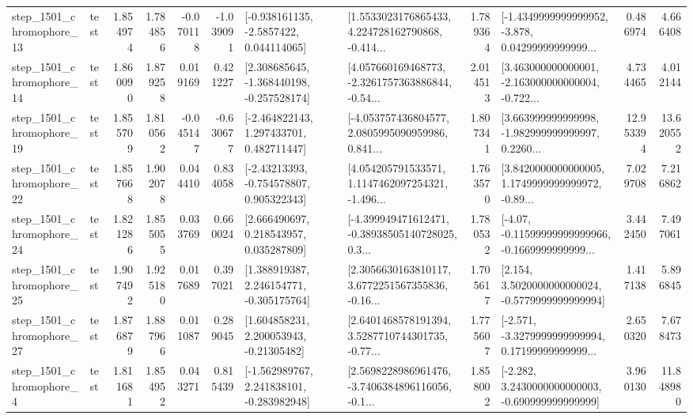 \begin{tabular}{llrrrrllrlrr}
 step\_1501\_chromophore\_13 &      test &      1.854974 &    1.784856 &     -0.070118 & -1.039091 &     [-0.938161135, -2.5857422, 0.044114065] &  [1.5533023176865433, 4.224728162790868, -0.414... &       1.789364 &  [-1.4349999999999952, -3.878, 0.04299999999999... &            0.486974 &          4.666408 \\
 step\_1501\_chromophore\_14 &      test &      1.860090 &    1.879258 &      0.019169 &  0.421227 &   [2.308685645, -1.368440198, -0.257528174] &  [4.057660169468773, -2.3261757363886844, -0.54... &       2.014513 &  [3.463000000000001, -2.163000000000004, -0.722... &            4.734465 &          4.012144 \\
 step\_1501\_chromophore\_19 &      test &      1.855709 &    1.810562 &     -0.045147 & -0.630677 &    [-2.464822143, 1.297433701, 0.482711447] &  [-4.053757436804577, 2.0805995090959986, 0.841... &       1.807341 &  [3.663999999999998, -1.982999999999997, 0.2260... &           12.953394 &         13.620552 \\
 step\_1501\_chromophore\_22 &      test &      1.857668 &    1.902078 &      0.044410 &  0.834058 &    [-2.43213393, -0.754578807, 0.905322343] &  [4.054205791533571, 1.1147462097254321, -1.496... &       1.763570 &  [3.8420000000000005, 1.1749999999999972, -0.89... &            7.029708 &          7.216862 \\
 step\_1501\_chromophore\_24 &      test &      1.821286 &    1.855055 &      0.033769 &  0.660024 &     [2.666490697, 0.218543957, 0.035287809] &  [-4.399949471612471, -0.38938505140728025, 0.3... &       1.780532 &  [-4.07, -0.11599999999999966, -0.1669999999999... &            3.442450 &          7.497061 \\
 step\_1501\_chromophore\_25 &      test &      1.907492 &    1.925180 &      0.017689 &  0.397021 &    [1.388919387, 2.246154771, -0.305175764] &  [2.3056630163810117, 3.6772251567355836, -0.16... &       1.705617 &   [2.154, 3.5020000000000024, -0.5779999999999994] &            1.417138 &          5.896845 \\
 step\_1501\_chromophore\_27 &      test &      1.876879 &    1.887966 &      0.011087 &  0.289045 &     [1.604858231, 2.200053943, -0.21305482] &  [2.6401468578191394, 3.5287710744301735, -0.77... &       1.775607 &  [-2.571, -3.3279999999999994, 0.17199999999999... &            2.650320 &          7.678473 \\
  step\_1501\_chromophore\_4 &      test &      1.811681 &    1.854952 &      0.043271 &  0.815439 &   [-1.562989767, 2.241838101, -0.283982948] &  [2.5698228986961476, -3.7406384896116056, -0.1... &       1.858002 &   [-2.282, 3.2430000000000003, -0.690999999999999] &            3.960130 &         11.848980 \\

\end{tabular}
